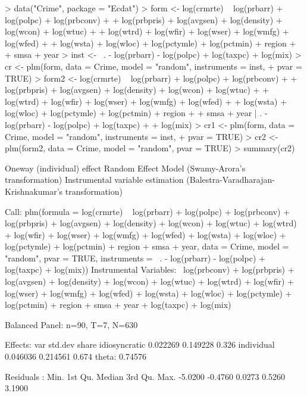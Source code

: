 \documentclass[a4paper]{article}
\begin{document}
\begin{Schunk}
\begin{Sinput}
> data("Crime", package = "Ecdat")
> form <- log(crmrte) ~ log(prbarr) + log(polpc) + log(prbconv) + 
+     log(prbpris) + log(avgsen) + log(density) + log(wcon) + log(wtuc) + 
+     log(wtrd) + log(wfir) + log(wser) + log(wmfg) + log(wfed) + 
+     log(wsta) + log(wloc) + log(pctymle) + log(pctmin) + region + 
+     smsa + year
> inst <- ~. - log(prbarr) - log(polpc) + log(taxpc) + log(mix)
> cr <- plm(form, data = Crime, model = "random", instruments = inst, 
+     pvar = TRUE)
> form2 <- log(crmrte) ~ log(prbarr) + log(polpc) + log(prbconv) + 
+     log(prbpris) + log(avgsen) + log(density) + log(wcon) + log(wtuc) + 
+     log(wtrd) + log(wfir) + log(wser) + log(wmfg) + log(wfed) + 
+     log(wsta) + log(wloc) + log(pctymle) + log(pctmin) + region + 
+     smsa + year | . - log(prbarr) - log(polpc) + log(taxpc) + 
+     log(mix)
> cr1 <- plm(form, data = Crime, model = "random", instruments = inst, 
+     pvar = TRUE)
> cr2 <- plm(form2, data = Crime, model = "random", pvar = TRUE)
> summary(cr2)
\end{Sinput}
\begin{Soutput}
Oneway (individual) effect Random Effect Model (Swamy-Arora's transformation)
Instrumental variable estimation (Balestra-Varadharajan-Krishnakumar's transformation)

Call:
plm(formula = log(crmrte) ~ log(prbarr) + log(polpc) + log(prbconv) + 
    log(prbpris) + log(avgsen) + log(density) + log(wcon) + log(wtuc) + 
    log(wtrd) + log(wfir) + log(wser) + log(wmfg) + log(wfed) + 
    log(wsta) + log(wloc) + log(pctymle) + log(pctmin) + region + 
    smsa + year, data = Crime, model = "random", pvar = TRUE, 
    instruments = ~. - log(prbarr) - log(polpc) + log(taxpc) + 
        log(mix))
Instrumental Variables:
~log(prbconv) + log(prbpris) + log(avgsen) + log(density) + log(wcon) + log(wtuc) + 
    log(wtrd) + log(wfir) + log(wser) + log(wmfg) + log(wfed) + log(wsta) + log(wloc) + 
    log(pctymle) + log(pctmin) + region + smsa + year + log(taxpc) + log(mix)

Balanced Panel: n=90, T=7, N=630

Effects:
                   var  std.dev share
idiosyncratic 0.022269 0.149228 0.326
individual    0.046036 0.214561 0.674
theta:  0.74576  

Residuals :
   Min. 1st Qu.  Median 3rd Qu.    Max. 
-5.0200 -0.4760  0.0273  0.5260  3.1900 


\end{Soutput}
\end{Schunk}
\end{document}
